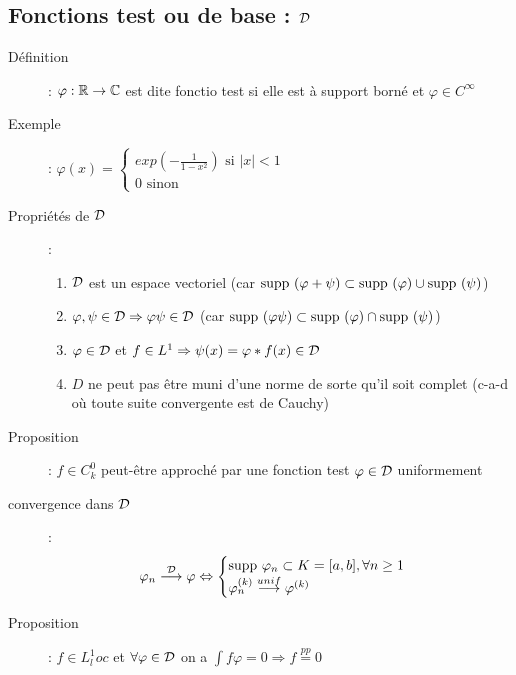 \subsection{Fonctions test ou de base : $\mathcal{D}$}
\begin{description}
\item[Définition] : $\varphi:\mathbb{R}\rightarrow\mathbb{C}$ est dite fonctio test si elle est à support borné et $\varphi\in C^\infty$
\item[Exemple] : $\varphi(x)=\begin{cases}
    exp\left(-\frac{1}{1-x^2}\right)\textrm{ si }|x|<1\\
    0\textrm{ sinon}
\end{cases}$
\item[Propriétés de $\mathcal{D}$] :
\begin{enumerate}
    \item $\mathcal{D}$ est un espace vectoriel (car $\textrm{supp }(\varphi+\psi)\subset\textrm{supp }(\varphi)\cup\textrm{supp }(\psi)$)
    \item $\varphi,\psi\in\mathcal{D}\Rightarrow\varphi\psi\in\mathcal{D}$ (car $\textrm{supp }(\varphi\psi)\subset\textrm{supp }(\varphi)\cap\textrm{supp }(\psi)$)
    \item $\varphi\in\mathcal{D}$ et $f\in L^1\Rightarrow\psi(x)=\varphi * f(x)\in\mathcal{D}$
    \item $D$ ne peut pas être muni d’une norme de sorte qu’il soit complet (c-a-d où toute suite convergente est de Cauchy)
\end{enumerate}
\item[Proposition] : $f\in C^0_k$ peut-être approché par une fonction test $\varphi\in\mathcal{D}$ uniformement
\item[convergence dans $\mathcal{D}$] :
    \[
        \varphi_n\overset{\mathcal{D}}{\longrightarrow}\varphi
        \Leftrightarrow
        \begin{cases}
            \textrm{supp }\varphi_n\subset K=[a,b], \forall n\ge 1\\
            \varphi_n^{(k)}\overset{unif}{\longrightarrow}\varphi^{(k)}
        \end{cases}
    \]
\item[Proposition] : $f\in L^1_loc$ et $\forall\varphi\in\mathcal{D}$ on a $\int f\varphi=0\Rightarrow f\overset{pp}{=}0$
\end{description}
